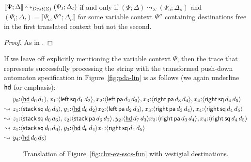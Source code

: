 \begin{theorem}~\\\label{thm:destcorrect}
$\llbracket \Psi; \Delta \rrbracket \leadsto_{{\it Dest}(\Sigma)}
 (\Psi_l; \Delta_l)$ if and only if 
$(\Psi; \Delta) \leadsto_\Sigma (\Psi_o; \Delta_o)$ and
$(\Psi_l; \Delta_l) = \llbracket \Psi_o, \Psi''; \Delta_o \rrbracket$ 
for some variable 
context $\Psi''$ containing destinations free in the first translated
context but not the second.
\end{theorem}

\begin{proof}
As in \cite[Theorem 2]{simmons11logical}.
\end{proof}


If we leave off explicitly mentioning the variable context $\Psi$, 
then the trace that represents successfully processing 
the string {\sf [ ( ) ] }
with the transformed push-down automaton 
specification in Figure~\ref{fig:pda-lin} 
is as follows (we again underline ${\sf hd}$
for emphasis):
\begin{align*}
           & y_0{:}\langle {\underline{\sf hd}\,d_0\,d_1} \rangle,
             x_1{:}\langle {{\sf left}\,{\sf sq}\,d_1\,d_2} \rangle,
             x_2{:}\langle {{\sf left}\,{\sf pa}\,d_2\,d_3} \rangle,
             x_3{:}\langle {{\sf right}\,{\sf pa}\,d_3\,d_4} \rangle,
             x_4{:}\langle {{\sf right}\,{\sf sq}\,d_4\,d_5} \rangle
\\
\leadsto ~ & z_1{:}\langle {{\sf stack}\,{\sf sq}\,d_0\,d_6} \rangle,
             y_1{:}\langle {\underline{\sf hd}\,d_6\,d_2} \rangle
             x_2{:}\langle {{\sf left}\,{\sf pa}\,d_2\,d_3} \rangle,
             x_3{:}\langle {{\sf right}\,{\sf pa}\,d_3\,d_4} \rangle,
             x_4{:}\langle {{\sf right}\,{\sf sq}\,d_4\,d_5} \rangle
\\
\leadsto ~ & z_1{:}\langle {{\sf stack}\,{\sf sq}\,d_0\,d_6} \rangle,
             z_2{:}\langle {{\sf stack}\,{\sf pa}\,d_6\,d_7} \rangle,
             y_2{:}\langle {\underline{\sf hd}\,d_7\,d_3} \rangle
             x_3{:}\langle {{\sf right}\,{\sf pa}\,d_3\,d_4} \rangle,
             x_4{:}\langle {{\sf right}\,{\sf sq}\,d_4\,d_5} \rangle
\\
\leadsto ~ & z_1{:}\langle {{\sf stack}\,{\sf sq}\,d_0\,d_6} \rangle,
             y_3{:}\langle {\underline{\sf hd}\,d_6\,d_4} \rangle
             x_4{:}\langle {{\sf right}\,{\sf sq}\,d_4\,d_5} \rangle
\\
\leadsto ~ & y_4{:}\langle {\underline{\sf hd}\,d_0\,d_5} \rangle
\end{align*}


\begin{figure}[t]
\caption{Translation of Figure~\ref{fig:cbv-ev-ssos-fun} with vestigial destinations.}
\label{fig:dest-vestige}
\end{figure}

